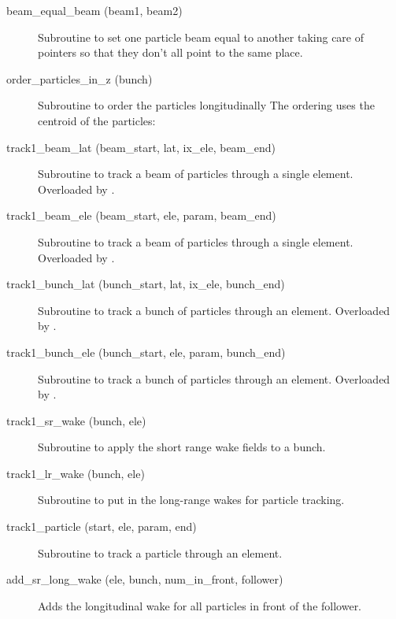 \begin{description}

\item[beam_equal_beam (beam1, beam2)] \Newline 
Subroutine to set one particle beam equal to another taking care of
pointers so that they don't all point to the same place.

\item[order_particles_in_z (bunch)] \Newline 
Subroutine to order the particles longitudinally 
The ordering uses the centroid of the particles:

\item[track1_beam_lat (beam_start, lat, ix_ele, beam_end)] \Newline 
Subroutine to track a beam of particles through a single element.
Overloaded by .

\item[track1_beam_ele (beam_start, ele, param, beam_end)] \Newline 
Subroutine to track a beam of particles through a single element.
Overloaded by .

\item[track1_bunch_lat (bunch_start, lat, ix_ele, bunch_end)] \Newline 
Subroutine to track a bunch of particles through an element.
Overloaded by .

\item[track1_bunch_ele (bunch_start, ele, param, bunch_end)] \Newline 
Subroutine to track a bunch of particles through an element.
Overloaded by .

\item[track1_sr_wake (bunch, ele)] \Newline 
Subroutine to apply the short range wake fields to a bunch. 

\item[track1_lr_wake (bunch, ele)] \Newline 
Subroutine to put in the long-range wakes for particle tracking.

\item[track1_particle (start, ele, param, end)] \Newline 
Subroutine to track a particle through an element.

\item[add_sr_long_wake (ele, bunch, num_in_front, follower)] \Newline 
Adds the longitudinal wake for all particles in front of the follower.


\end{description}

